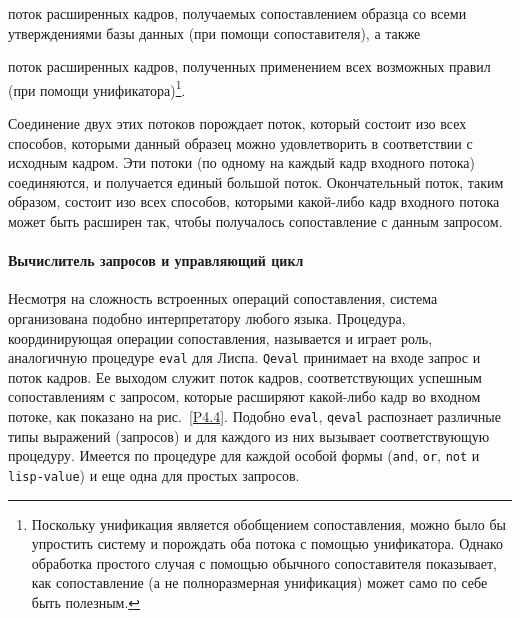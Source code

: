 \begin{plainlist}
\item
поток расширенных кадров, получаемых сопоставлением
образца со всеми утверждениями базы данных (при помощи сопоставителя),
а также

\item
поток расширенных кадров, полученных применением
всех возможных правил (при помощи 
унификатора)\footnote{Поскольку унификация является обобщением
сопоставления, можно было бы упростить систему и порождать оба потока
с помощью унификатора.  Однако обработка простого случая с помощью
обычного сопоставителя показывает, как сопоставление (а не полноразмерная
унификация) может само по себе быть полезным.}.
\end{plainlist}
Соединение двух этих потоков порождает поток, который состоит изо всех
способов, которыми данный образец можно удовлетворить в соответствии с
исходным кадром.  Эти потоки (по одному на каждый кадр входного
потока) соединяются, и получается единый большой поток.  Окончательный 
поток, таким образом, состоит изо всех способов, которыми какой-либо кадр 
входного потока может быть расширен так, чтобы получалось сопоставление с
данным запросом.

\paragraph{Вычислитель запросов и управляющий цикл}

Несмотря 
на сложность встроенных операций сопоставления,
система организована подобно   интерпретатору любого языка.  Процедура,
координирующая операции сопоставления, называется  
 и
играет роль, аналогичную процедуре {\tt eval} для
Лиспа. {\tt Qeval} принимает на входе запрос и поток кадров.
Ее выходом служит поток кадров, соответствующих успешным
сопоставлениям с запросом, которые расширяют какой-либо кадр во
входном потоке, как показано на рис.~\ref{P4.4}.  Подобно
{\tt eval}, {\tt qeval} распознает
различные типы выражений (запросов) и для каждого из них вызывает
соответствующую процедуру.  Имеется по процедуре для каждой особой
формы ({\tt and}, {\tt or}, {\tt not} и {\tt lisp-value}) и
еще одна для простых запросов.

